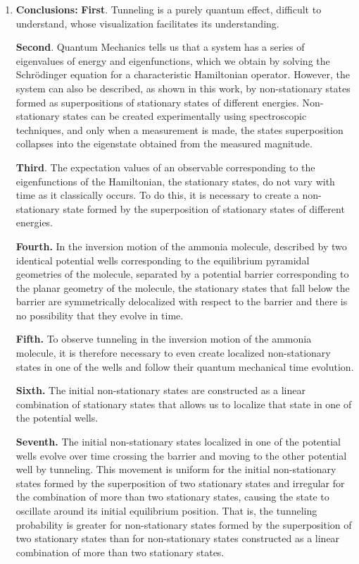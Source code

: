 \documentclass[12pt, a4paper]{article}
\begin{document}
\begin{enumerate}[label=\textbf{Slide \arabic*.}]
    \item \textbf{Conclusions:}
        \textbf{First}. Tunneling is a purely quantum effect, difficult to understand, whose visualization facilitates its understanding.

        \textbf{Second}. Quantum Mechanics tells us that a system has a series of eigenvalues of energy and eigenfunctions, which we obtain by solving the Schrödinger equation for a characteristic Hamiltonian operator. However, the system can also be described, as shown in this work, by non-stationary states formed as superpositions of stationary states of different energies. Non-stationary states can be created experimentally using spectroscopic techniques, and only when a measurement is made, the states superposition collapses into the eigenstate obtained from the measured magnitude.

        \textbf{Third}. The expectation values of an observable corresponding to the eigenfunctions of the Hamiltonian, the stationary states, do not vary with time as it classically occurs. To do this, it is necessary to create a non-stationary state formed by the superposition of stationary states of different energies.

         \textbf{Fourth.} In the inversion motion of the ammonia molecule, described by two identical potential wells corresponding to the equilibrium pyramidal geometries of the molecule, separated by a potential barrier corresponding to the planar geometry of the molecule, the stationary states that fall below the barrier are symmetrically delocalized with respect to the barrier and there is no possibility that they evolve in time.

        \textbf{Fifth.} To observe tunneling in the inversion motion of the ammonia molecule, it is therefore necessary to even create localized non-stationary states in one of the wells and follow their quantum mechanical time evolution.

        \textbf{Sixth.} The initial non-stationary states are constructed as a linear combination of stationary states that allows us to localize that state in one of the potential wells.

        \textbf{Seventh.} The initial non-stationary states localized in one of the potential wells evolve over time crossing the barrier and moving to the other potential well by tunneling. This movement is uniform for the initial non-stationary states formed by the superposition of two stationary states and irregular for the combination of more than two stationary states, causing the state to oscillate around its initial equilibrium position. That is, the tunneling probability is greater for non-stationary states formed by the superposition of two stationary states than for non-stationary states constructed as a linear combination of more than two stationary states.
\end{enumerate}
\end{document}
